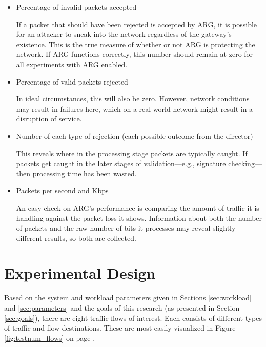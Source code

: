\begin{itemize}
\item Percentage of invalid packets accepted
	\par If a packet that should have been rejected is accepted by \ac{ARG}, it is possible for an attacker to sneak into the network regardless of the gateway's existence. This is the true measure of whether or not \ac{ARG} is protecting the network. If \ac{ARG} functions correctly, this number should remain at zero for all experiments with \ac{ARG} enabled.

\item Percentage of valid packets rejected
	\par In ideal circumstances, this will also be zero. However, network conditions may result in failures here, which on a real-world network might result in a disruption of service. 

\item Number of each type of rejection (each possible outcome from the director)
	\par This reveals where in the processing stage packets are typically caught. If packets get caught in the later stages of validation---e.g., signature checking---then processing time has been wasted.

\item Packets per second and \acf{Kbps}
	\par An easy check on \ac{ARG}'s performance is comparing the amount of traffic it is handling against the packet loss it shows. Information about both the number of packets and the raw number of bits it processes may reveal slightly different results, so both are collected.
\end{itemize}

\section{Experimental Design}
\label{sec:exp_design}
\par Based on the system and workload parameters given in Sections \ref{sec:workload} and \ref{sec:parameters} and the goals of this research (as presented in Section \ref{sec:goals}), there are eight traffic flows of interest. Each consists of different types of traffic and flow destinations. These are most easily visualized in Figure \ref{fig:testnum_flows} on page \pageref{fig:testnum_flows}.

